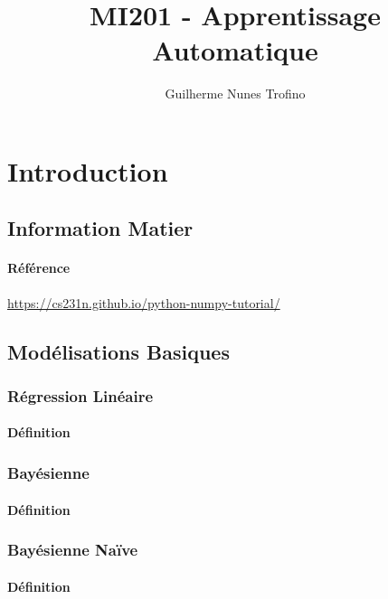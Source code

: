 \documentclass{article}
\title{MI201 - Apprentissage Automatique}
\author{Guilherme Nunes Trofino}
\begin{document}
\maketitle


\newpage\tableofcontents

\section{Introduction}

% 
% 


\subsection{Information Matier}
\paragraph{Référence}
\url{https://cs231n.github.io/python-numpy-tutorial/}

\subsection{Modélisations Basiques}
\subsubsection{Régression Linéaire}
\paragraph{Définition}

\subsubsection{Bayésienne}
\paragraph{Définition}

\subsubsection{Bayésienne Naïve}
\paragraph{Définition}
\end{document}
